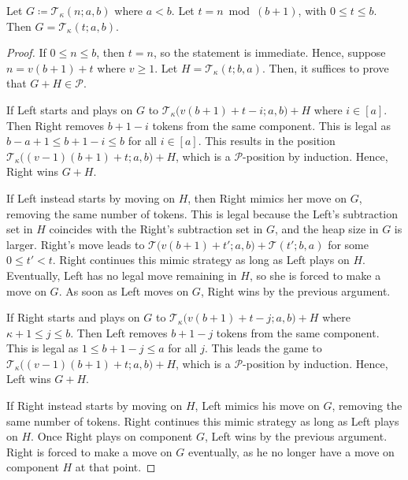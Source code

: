 \documentclass[oneside,reqno]{amsart}
\newcommand{\ts}{\mathcal{T}}
\newcommand{\pp}{\mathscr{P}}
\begin{document}
Let $G\coloneq\ts_{{\kappa}}(n;a,b)$ where $a<b$. %
Let $t= n \bmod (b+1)$, with $0\le t\le b$. Then $G=\ts_{{\kappa}}(t;a,b)$.
\begin{proof}
    If $0\le n\le b$, then $t=n$, so the statement is immediate. Hence, suppose $n=v(b+1)+t$ where $v\ge 1$. Let $H=\ts_{{\kappa}}(t;b,a)$. Then, it suffices to prove that $G+H\in \pp$. 
    
    If Left starts and plays on $G$ to $\ts_{{\kappa}}\big(v(b+1)+t-i;a,b\big)+H$ where $i\in [a]$. Then Right removes $b+1-i$ tokens from the same component. This is legal as $b-a+1\le b+1-i\le b$ for all $i\in[a]$. This results in the position $\ts_{\kappa}\big((v-1)(b+1)+t;a,b\big)+H$, which is a $\pp$-position by induction. Hence, Right wins $G+H$. 

    If Left instead starts by moving on $H$, then Right mimics her move on $G$, removing the same number of tokens. %
    This is legal because the Left's subtraction set in $H$ coincides with the Right's subtraction set in $G$,%
    and the heap size in $G$ is larger. Right's move leads to $\ts\big(v(b+1)+ t';a,b\big)+\ts( t';b,a)$ for some $0\le  t'< t$. Right continues this mimic strategy as long as Left plays on $H$. %
    Eventually, Left has no legal move remaining in $H$, so she is forced to make a move on $G$. As soon as Left moves on $G$, Right wins by the previous argument.
    
    
    If Right starts and plays on $G$ to $\ts_{\kappa}\big(v(b+1)+t-j;a,b\big)+H$ where ${\kappa}+1\le j\le b$. Then Left removes $b+1-j$ tokens from the same component. This is legal as $1\le b+1-j\le a$ for all $j$. This leads the game to $\ts_{\kappa}\big((v-1)(b+1)+t;a,b\big)+H$, which is a $\pp$-position by induction. Hence, Left wins $G+H$. 

    If Right instead starts by moving on $H$, Left mimics his move on $G$, removing the same number of tokens. Right continues this mimic strategy as long as Left plays on $H$. Once Right plays on component $G$, Left wins by the previous argument. Right is forced to make a move on $G$ eventually, as he no longer have a move on component $H$ at that point. 
\end{proof}
\end{document}
